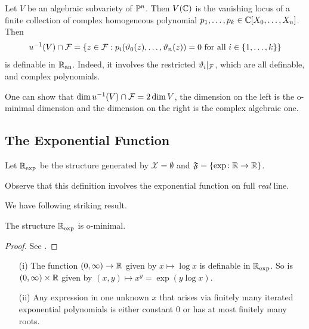 \begin{example}
  Let $V$ be an algebraic subvariety of ${\mathbb{P}}^n$. Then $V({\mathbb{C}})$ is the
  vanishing locus of a finite collection of complex homogeneous
  polynomial $p_1,\ldots,p_k\in {\mathbb{C}}[X_0,\ldots,X_n]$. Then
  \begin{equation*}
    u^{-1}(V) \cap {\mathcal F} = \left\{ z \in {\mathcal F} :
      p_i(\vartheta_0(z),\ldots,\vartheta_n(z))=0 \text{ for all }i\in
      \{1,\ldots,k\} \right\}
  \end{equation*}
  is definable in ${{\mathbb{R}}_{\mathrm{an}}}$. Indeed, it involves the restricted
  $\vartheta_i|_{{\mathcal F}}$, which are all definable, and complex
  polynomials.

  One can show that $\dim u^{-1}(V)\cap {\mathcal F} = 2\dim V$, the dimension
  on the left is the o-minimal dimension and the dimension on the
  right is the complex algebraic one. 
\end{example}

\subsection{The Exponential Function}

\begin{definition}
  Let ${{\mathbb{R}}_{\mathrm{exp}}}$ be the structure generated by $\mathscr{X}=\emptyset$
  and $\mathfrak{F} = \{ \exp \colon {\mathbb{R}}\rightarrow{\mathbb{R}}\}$. 
\end{definition}

Observe that this definition involves the exponential function on full
\emph{real} line.

We have  following striking result.

\begin{theorem}[Wilkie]
  The structure ${{\mathbb{R}}_{\mathrm{exp}}}$ is o-minimal.
\end{theorem}
\begin{proof}
  See \cite{Wilkie:96}. 
\end{proof}

\begin{example}
  \begin{enumerate}
  \item [(i)]
    The function $(0,\infty)\rightarrow{\mathbb{R}}$ given by $x\mapsto \log x$
    is definable in ${{\mathbb{R}}_{\mathrm{exp}}}$.
    So is $(0,\infty)\times{\mathbb{R}}$ given by $(x,y)\mapsto x^y = \exp(y\log x)$.
  \item[(ii)] Any expression in one unknown $x$
    that arises via finitely many iterated
    exponential polynomials is either constant $0$ or has at most
    finitely many roots.
  \end{enumerate}
\end{example}

